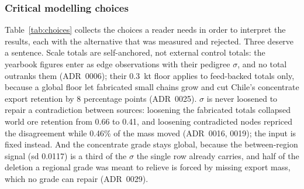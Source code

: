 \subsubsection{Critical modelling choices}\label{sec:choices}

Table~\ref{tab:choices} collects the choices a reader needs in order to
interpret the results, each with the alternative that was measured and
rejected. Three deserve a sentence. Scale totals are self-anchored, not
external control totals: the yearbook figures enter as edge observations with
their pedigree $\sigma$, and no total outranks them (ADR~0006); their 0.3~kt
floor applies to feed-backed totals only, because a global floor let
fabricated small chains grow and cut Chile's concentrate export retention by
8 percentage points (ADR~0025). $\sigma$ is never loosened to repair a
contradiction between sources: loosening the fabricated totals collapsed
world ore retention from 0.66 to 0.41, and loosening contradicted nodes
repriced the disagreement while 0.46\% of the mass moved (ADR~0016, 0019);
the input is fixed instead. And the concentrate grade stays global, because
the between-region signal (sd 0.0117) is a third of the $\sigma$ the single
row already carries, and half of the deletion a regional grade was meant to
relieve is forced by missing export mass, which no grade can repair
(ADR~0029).


